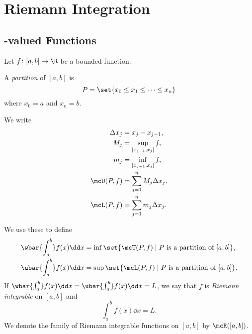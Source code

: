 \chapter{Riemann Integration} \label{chp:riemann}
\section{\R-valued Functions}
Let $f\colon [a, b] \to \R$ be a bounded function.
\begin{definition}[Partition] \label{def:partition}
    A \textit{partition} of $[a, b]$ is \[
        P = \set{x_0 \le x_1 \le \cdots \le x_n}
    \] where $x_0 = a$ and $x_n = b$.

    We write \begin{align*}
        \Delta x_j &= x_j - x_{j-1}, \\
        M_j   &= \sup_{[x_{j-1}, x_j]} f, \\
        m_j   &= \inf_{[x_{j-1}, x_j]} f, \\
        \mcU(P, f) &= \sum_{j=1}^n M_j \Delta x_j, \\
        \mcL(P, f) &= \sum_{j=1}^n m_j \Delta x_j.
    \end{align*}
\end{definition}

\begin{definition*} \label{def:riemann}
    We use these to define \begin{align*}
        \wbar{\int_a^b} f(x) \dd x
        &= \inf \set{\mcU(P, f) \mid P \text{ is a partition of } [a, b]}, \\
        \ubar{\int_a^b} f(x) \dd x
        &= \sup \set{\mcL(P, f) \mid P \text{ is a partition of } [a, b]}.
    \end{align*}
    If $\wbar{\int_a^b} f(x) \dd x = \ubar{\int_a^b} f(x) \dd x = L$,
    we say that $f$ is \textit{Riemann integrable} on $[a, b]$ and \[
        \int_a^b f(x) \dd x = L.
    \] We denote the family of Riemann integrable functions on $[a, b]$ by
    $\mcR([a, b])$.
\end{definition*}

